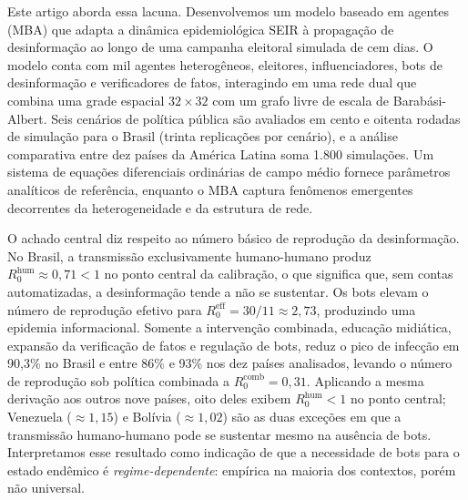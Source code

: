 \documentclass[12pt,a4paper]{article}
\theoremstyle{definition}
\theoremstyle{plain}
\begin{document}
Este artigo aborda essa lacuna. Desenvolvemos um modelo baseado em agentes (MBA) que adapta a dinâmica epidemiológica SEIR à propagação de desinformação ao longo de uma campanha eleitoral simulada de cem dias. O modelo conta com mil agentes heterogêneos, eleitores, influenciadores, bots de desinformação e verificadores de fatos, interagindo em uma rede dual que combina uma grade espacial $32 \times 32$ com um grafo livre de escala de Barabási-Albert. Seis cenários de política pública são avaliados em cento e oitenta rodadas de simulação para o Brasil (trinta replicações por cenário), e a análise comparativa entre dez países da América Latina soma 1.800 simulações. Um sistema de equações diferenciais ordinárias de campo médio fornece parâmetros analíticos de referência, enquanto o MBA captura fenômenos emergentes decorrentes da heterogeneidade e da estrutura de rede.

O achado central diz respeito ao número básico de reprodução da desinformação. No Brasil, a transmissão exclusivamente humano-humano produz $R_0^{\text{hum}} \approx 0{,}71 < 1$ no ponto central da calibração, o que significa que, sem contas automatizadas, a desinformação tende a não se sustentar. Os bots elevam o número de reprodução efetivo para $R_0^{\text{eff}} = 30/11 \approx 2{,}73$, produzindo uma epidemia informacional. Somente a intervenção combinada, educação midiática, expansão da verificação de fatos e regulação de bots, reduz o pico de infecção em 90,3\% no Brasil e entre 86\% e 93\% nos dez países analisados, levando o número de reprodução sob política combinada a $R_0^{\text{comb}} = 0{,}31$. Aplicando a mesma derivação aos outros nove países, oito deles exibem $R_0^{\text{hum}} < 1$ no ponto central; Venezuela ($\approx 1{,}15$) e Bolívia ($\approx 1{,}02$) são as duas exceções em que a transmissão humano-humano pode se sustentar mesmo na ausência de bots. Interpretamos esse resultado como indicação de que a necessidade de bots para o estado endêmico é \emph{regime-dependente}: empírica na maioria dos contextos, porém não universal.
\end{document}
